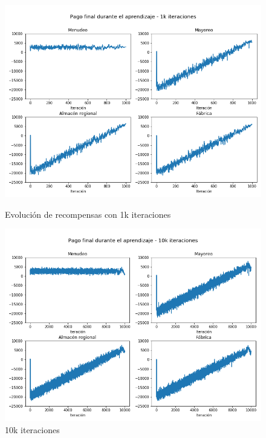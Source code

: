 \begin{figure}[!htb]
   \begin{minipage}{0.48\textwidth}
     \centering
     \includegraphics[width=1\linewidth]{tesis_tex/figs/policyiteration_payouts_1000.png}
     \caption{Evoluci\'on de recompensas con 1k iteraciones}\label{politer_payouts_1000}
   \end{minipage}\hfill
   \begin{minipage}{0.48\textwidth}
     \centering
     \includegraphics[width=1\linewidth]{tesis_tex/figs/policyiteration_payouts_10000.png}
     \caption{10k iteraciones}\label{politer_payouts_10000}
   \end{minipage}
\end{figure}

